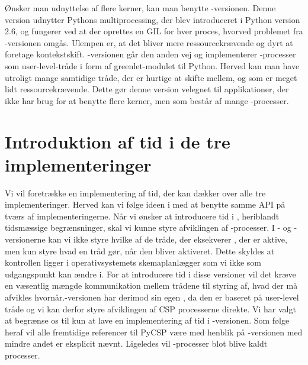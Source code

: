 Ønsker man udnyttelse af flere kerner, kan man benytte -versionen. Denne version udnytter Pythons multiprocessing, der blev introduceret i Python version 2.6, og fungerer ved at der oprettes en GIL for hver proces, hvorved problemet fra -versionen omgås. Ulempen er, at det bliver mere ressourcekrævende og dyrt at foretage kontekstskift.
-versionen går den anden vej og implementerer \csp-processer som user-level-tråde i form af greenlet-modulet til Python\cite{greenlet}. Herved kan man have utroligt mange samtidige tråde, der er hurtige at skifte mellem, og som er meget lidt ressourcekrævende. Dette gør denne version velegnet til applikationer, der ikke har brug for at benytte flere kerner, men som består af mange \csp-processer. 

\section{Introduktion af tid i de tre implementeringer}
Vi vil foretrække en implementering af tid, der kan dækker over alle tre implementeringer. Herved kan vi følge ideen i \pycsp med at benytte samme API på tværs af implementeringerne. Når vi ønsker at introducere tid i \pycsp, heriblandt tidsmæssige begrænsninger, skal vi kunne styre afviklingen af \csp-processer. I  - og -versionerne kan vi ikke styre hvilke af de tråde, der eksekverer \csp, der er aktive, men kun styre hvad en tråd gør, når den bliver aktiveret. Dette skyldes at kontrollen ligger i operativsystemets skemaplanlægger som vi ikke som udgangspunkt kan ændre i. For at introducere tid i disse versioner vil det kræve en væsentlig mængde kommunikation mellem trådene til styring af, hvad der må afvikles hvornår.-versionen har derimod sin egen \sched , da den er baseret på user-level tråde og vi kan derfor styre afviklingen af CSP processerne direkte. Vi har valgt at begrænse os til kun at lave en implementering af tid i -versionen. Som følge heraf vil alle fremtidige referencer til PyCSP være med henblik på -versionen med mindre andet er eksplicit nævnt. Ligeledes vil \csp-processer  blot blive  kaldt  processer. 

